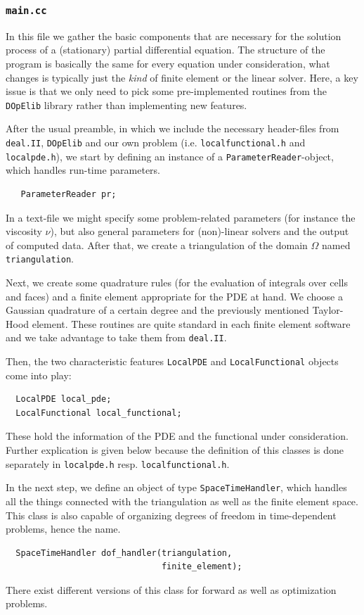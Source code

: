 \documentclass[smallextended]{svjour3}       %
\numberwithin{equation}{section}
\newcommand{\deal}{\texttt{deal.II}}
\newcommand{\dope}{\texttt{DOpElib}}
\begin{document}
\subsubsection{\texttt{main.cc}}
In this file we gather the basic components that are necessary for the
solution process of a (stationary) partial differential equation. The
structure of the program is basically the same for every equation under
consideration, what changes is typically just the \textit{kind} of  finite
element or the linear solver. Here, a key issue is that we only need to pick 
some pre-implemented routines from the \dope{} library rather than 
implementing new features.


After the usual preamble, in which we include the necessary header-files from \deal{}, \dope{} and our own problem (i.e. \texttt{localfunctional.h} and \texttt{localpde.h}), we start by defining an instance of a \texttt{ParameterReader}-object, which handles run-time parameters.
\begin{lstlisting}
   ParameterReader pr;
\end{lstlisting}
In a text-file we might specify some problem-related parameters (for instance the viscosity $\nu$), but also general parameters for (non)-linear solvers and the output of computed data. 
After that, we create a triangulation of the domain $\Omega$ named \texttt{triangulation}.

Next, we create some quadrature rules (for the evaluation of integrals over
cells and faces) and a finite element appropriate for the PDE at hand. We
choose a Gaussian quadrature of a certain degree and the previously mentioned
Taylor-Hood element. These routines are quite standard in each finite element
software and we take advantage to take them from \deal{}.

Then, the two characteristic features \texttt{LocalPDE} and \texttt{LocalFunctional} objects come into play:
\begin{lstlisting}
  LocalPDE local_pde;
  LocalFunctional local_functional;
\end{lstlisting}
These hold the information of the PDE and the functional under consideration. Further explication is given below because
the definition of this classes is done separately in \texttt{localpde.h} resp.   \texttt{localfunctional.h}.

In the next step, we define an object of type \texttt{SpaceTimeHandler}, which handles all the things connected with the triangulation as well as the finite element space. This class is also capable of organizing degrees of freedom in time-dependent problems, hence the name. 
\begin{lstlisting}
  SpaceTimeHandler dof_handler(triangulation,
                               finite_element);
\end{lstlisting}
There exist different versions of this class for forward as well as optimization problems. 
\end{document}
